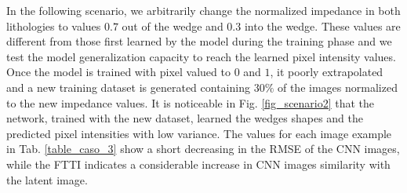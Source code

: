 \documentclass[conference]{IEEEtran}
\begin{document}
In the following scenario, we arbitrarily change the normalized impedance in both
lithologies to values $ 0.7 $ out of the wedge and $ 0.3$ into the wedge.
These values are different from those first learned by the model during the
training phase and we test the model generalization capacity to reach
the learned pixel intensity values. Once the model is trained with pixel valued to
$ 0 $ and $ 1 $, it poorly extrapolated and a new training dataset is generated containing $30\%$
of the images normalized to the new impedance values. It is noticeable in
Fig. \ref{fig_scenario2} that the network, trained with the new dataset, learned
the wedges shapes and the predicted pixel intensities with low variance. The values
for each image example in Tab. \ref{table_caso_3} show a short decreasing in the RMSE
of the CNN images, while the FTTI indicates a considerable increase in CNN images similarity with the latent image.
\end{document}
